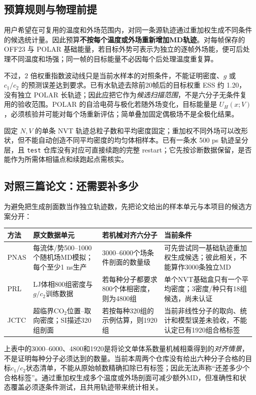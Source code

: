 \documentclass[11pt,a4paper]{article}
\begin{document}
\subsection{预算规则与物理前提}
用户希望在可复用的温度和外场范围内，对同一条源轨迹通过重加权生成不同条件的候选统计量。因此预算\textbf{不按每个温度或外场重新增加MD轨迹}。对每帧保存的 OFF23 与 POLAR 基础能量，若目标外势可表示为独立的逐帧外场能，便可后处理不同温度和场强；同一帧的目标能量不必因每个后处理温度重复算。

不过，$2$ 倍权重指数波动线只是当前水样本的对照条件，不能证明密度、$g$ 或 $c_1/c_2$ 的预测误差达到要求。已有水轨迹去除前20帧后的目标权重 ESS 约 1.20，没有独立 POLAR 长轨迹；因此应把它作为\emph{候选扫描范围}，不是六分子无条件复用的验收范围。POLAR 的自洽电荷与极化若随外场变化，目标能量是 $U_H(x;V)$，必须核验并可能对每个场重新评估；简单叠加固定偶极场不是全极化结果。

固定 $N,V$ 的单条 NVT 轨迹总粒子数和平均密度固定；重加权不同外场可以改形状，但不能自动创造不同平均密度的均匀体相样本。已有一条水 500 ps 轨迹呈分层，且 \texttt{test} 仓库没有对应可直接续跑的完整 restart；它先按诊断数据保留，是否能作为所需体相锚点和续跑起点需核实。

\subsection{对照三篇论文：还需要补多少}
为避免把生成剖面数当作独立轨迹数，先把论文给出的样本单元与本项目的候选方案分开：
\begin{center}\small\begin{tabular}{p{2.1cm}p{4.3cm}p{4.1cm}p{3.3cm}}\toprule
方法 & 原文数据单元 & 若机械对齐六分子 & 当前条件 \\\midrule
PNAS & 每流体/势500--1000个随机场MD模拟；每个至少1 ns生产 & 3000--6000个场条件剖面的数量级 & 可先尝试同一基础轨迹重加权生成候选；彼此相关，不能算作3000条独立MD \\
PRL & LJ体相800组密度与$g/c_2$训练数据 & 若每种分子都要求800个体相密度，则为4800组 & 单个NVT基础盒只有一个平均密度；3密度/种只有18组候选，尚未认证 \\
JCTC & 超临界CO$_2$位置--取向密度；SI描述320组剖面 & 若按每种320组的示例估算，则1920组 & 当前非线性分子的取向、统计和模型误差未验收，不能认定已有1920组合格标签 \\\bottomrule
\end{tabular}\end{center}
上表中的3000--6000、4800和1920是将论文单体系数量机械相乘得到的\emph{对齐情景}，不是证明每种分子必须达到的数量。当前本周两个仓库没有给出六种分子合格的目标$c_1/c_2$状态清单，不能从原始帧数精确扣除已有标签；因此无法声称“还差多少个合格标签”。通过重加权生成多个温度或外场剖面可减少额外MD，但准确性和状态覆盖必须逐条件测试，且共用轨迹带来统计相关。
\end{document}

